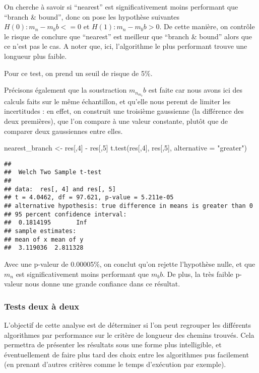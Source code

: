 \documentclass[
]{article}
\newenvironment{Shaded}{\begin{snugshade}}{\end{snugshade}}
\newcommand{\AttributeTok}[1]{\textcolor[rgb]{0.77,0.63,0.00}{#1}}
\newcommand{\DecValTok}[1]{\textcolor[rgb]{0.00,0.00,0.81}{#1}}
\newcommand{\FunctionTok}[1]{\textcolor[rgb]{0.00,0.00,0.00}{#1}}
\newcommand{\NormalTok}[1]{#1}
\newcommand{\OtherTok}[1]{\textcolor[rgb]{0.56,0.35,0.01}{#1}}
\newcommand{\SpecialCharTok}[1]{\textcolor[rgb]{0.00,0.00,0.00}{#1}}
\newcommand{\StringTok}[1]{\textcolor[rgb]{0.31,0.60,0.02}{#1}}
\begin{document}
On cherche à savoir si ``nearest'' est significativement moins
performant que ``branch \& bound'', donc on pose les hypothèse suivantes
\(H(0) : m_n - m_bb <= 0\) et \(H(1) : m_n-m_bb > 0\). De cette manière,
on contrôle le risque de conclure que ``nearest'' est meilleur que
``branch \& bound'' alors que ce n'est pas le cas. A noter que, ici,
l'algorithme le plus performant trouve une longueur plus faible.

Pour ce test, on prend un seuil de risque de 5\%.

Précisons également que la soustraction \(m_n _ m_bb\) est faite car
nous avons ici des calculs faits sur le même échantillon, et qu'elle
nous peremt de limiter les incertitudes : en effet, on construit une
troisième gaussienne (la différence des deux premières), que l'on
compare à une valeur constante, plutôt que de comparer deux gaussiennes
entre elles.

\begin{Shaded}
\begin{Highlighting}[]
\NormalTok{nearest\_branch }\OtherTok{\textless{}{-}}\NormalTok{ res[,}\DecValTok{4}\NormalTok{] }\SpecialCharTok{{-}}\NormalTok{ res[,}\DecValTok{5}\NormalTok{]}
\FunctionTok{t.test}\NormalTok{(res[,}\DecValTok{4}\NormalTok{], res[,}\DecValTok{5}\NormalTok{], }\AttributeTok{alternative =} \StringTok{"greater"}\NormalTok{)}
\end{Highlighting}
\end{Shaded}

\begin{verbatim}
## 
##  Welch Two Sample t-test
## 
## data:  res[, 4] and res[, 5]
## t = 4.0462, df = 97.621, p-value = 5.211e-05
## alternative hypothesis: true difference in means is greater than 0
## 95 percent confidence interval:
##  0.1814195       Inf
## sample estimates:
## mean of x mean of y 
##  3.119036  2.811328
\end{verbatim}

Avec une p-valeur de 0.00005\%, on conclut qu'on rejette l'hypothèse
nulle, et que \(m_n\) est significativement moins performant que
\(m_bb\). De plus, la très faible p-valeur nous donne une grande
confiance dans ce résultat.

\hypertarget{tests-deux-uxe0-deux}{%
\subsubsection{Tests deux à deux}\label{tests-deux-uxe0-deux}}

L'objectif de cette analyse est de déterminer si l'on peut regrouper les
différents algorithmes par performance sur le critère de longueur des
chemins trouvés. Cela permettra de présenter les résultats sous une
forme plus intelligible, et éventuellement de faire plus tard des choix
entre les algorithmes pus facilement (en prenant d'autres critères comme
le temps d'exécution par exemple).
\end{document}
